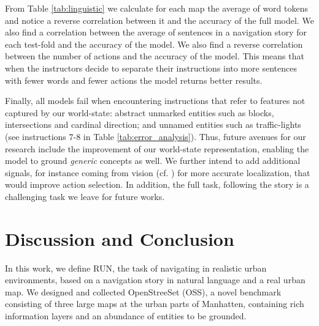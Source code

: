 \documentclass[11pt,a4paper]{article}
\begin{document}
From Table \ref{tab:linguistic} we calculate for each map the average of word tokens and notice a reverse correlation between it and the accuracy of the full model. We also find a correlation between the average of sentences in a navigation story for each test-fold and the accuracy of the model. We also find a reverse correlation between the number of actions and the accuracy of the model. This means that when the instructors decide to separate their instructions into more sentences with fewer words and fewer actions the model returns better results. \par


Finally, all models fail when encountering  instructions that refer to features not captured by our world-state: abstract unmarked entities  such as blocks, intersections and cardinal direction; and unnamed entities such as traffic-lights (see instructions 7-8 in Table \ref{tab:error_analysis}). Thus, future avenues for our research include the improvement of our world-state representation, enabling the model to ground  {\em generic} concepts as well. We further intend to add additional signals, for instance coming from vision
(cf. ) for more accurate localization, that would improve action selection. In addition, the full task, following the story is a challenging task we leave for future works.

 
 
\section{Discussion and Conclusion}
\label{conclusion}


In this work, we define RUN,  the task of navigating in  realistic urban environments, based on a navigation story in natural language and a real urban map.
%
We designed and collected  OpenStreeSet (OSS), a novel benchmark consisting of three large maps at the urban parts of Manhatten, containing rich information layers and an abundance of entities to be grounded.
\end{document}

